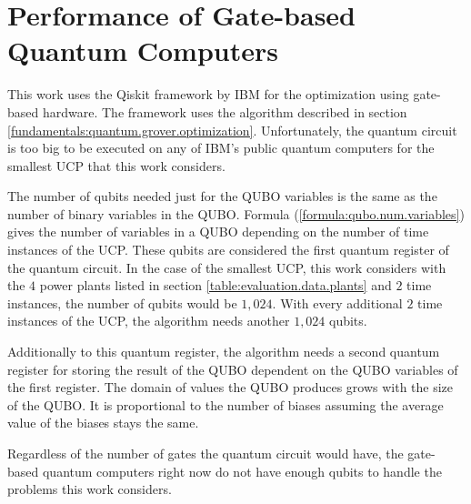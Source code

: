 \section{Performance of Gate-based Quantum Computers}

This work uses the Qiskit framework by IBM for the optimization using gate-based hardware.
The framework uses the algorithm described in section \ref{fundamentals:quantum.grover.optimization}.
Unfortunately, the quantum circuit is too big to be executed on any of IBM's public quantum computers for the smallest UCP that this work considers.

The number of qubits needed just for the QUBO variables is the same as the number of binary variables in the QUBO.
Formula (\ref{formula:qubo.num.variables}) gives the number of variables in a QUBO depending on the number of time instances of the UCP.
These qubits are considered the first quantum register of the quantum circuit.
In the case of the smallest UCP, this work considers with the $4$ power plants listed in section \ref{table:evaluation.data.plants} and $2$ time instances, the number of qubits would be $1, 024$.
With every additional $2$ time instances of the UCP, the algorithm needs another $1, 024$ qubits.

Additionally to this quantum register, the algorithm needs a second quantum register for storing the result of the QUBO dependent on the QUBO variables of the first register.
The domain of values the QUBO produces grows with the size of the QUBO.
It is proportional to the number of biases assuming the average value of the biases stays the same.

Regardless of the number of gates the quantum circuit would have, the gate-based quantum computers right now do not have enough qubits to handle the problems this work considers.
